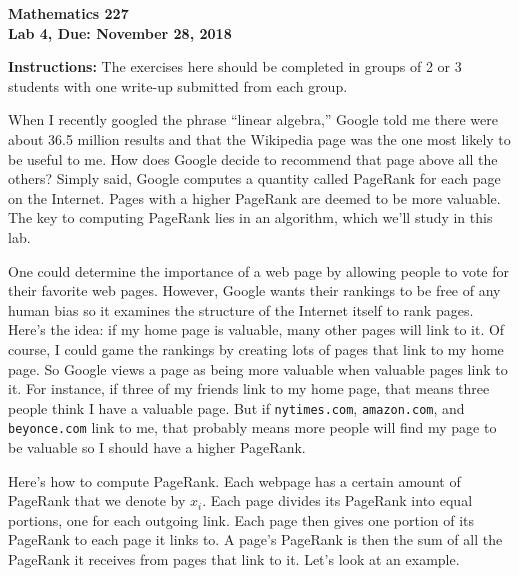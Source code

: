 \documentclass[12pt]{article}
\begin{document}
\noindent
{\bf Mathematics 227} \\ 
{\bf Lab 4, Due: November 28, 2018}

\bigskip
\noindent
{\bf Instructions:} The exercises here should be completed in groups
of 2 or 3 students with one write-up submitted from each group.

\medskip
When I recently googled the phrase ``linear algebra,'' Google told me
there were about 36.5 million results and that the Wikipedia page was
the one most likely to be useful to me.  How does Google decide to
recommend that page above all the others?  Simply said, Google
computes a quantity called PageRank for each page on the Internet.
Pages with a higher PageRank are deemed to be more valuable.  The key
to computing PageRank lies in an algorithm, which we'll study in this
lab.  

\medskip One could determine the importance of a web page by allowing
people to vote for their favorite web pages.  However, Google wants
their rankings to be free of any human bias so it examines the
structure of the Internet itself to rank pages.  Here's the idea:  if
my home page is valuable, many other pages will link to it.  Of course, I
could game the rankings by creating lots of pages that link to my home
page.  So Google views a page as being more valuable when valuable
pages link to it.  For instance, if three of my friends link to my
home page, that means three people think I have a valuable page.  But
if {\tt nytimes.com}, {\tt amazon.com}, and {\tt beyonce.com} link to
me, that probably means more people will find my page to be valuable
so I should have a higher PageRank.

\medskip
Here's how to compute PageRank.  Each webpage has a certain amount of
PageRank that we denote by $x_i$.  Each page divides its PageRank into
equal portions, one for each outgoing link.  Each page then gives one
portion of its PageRank to each page it links to.  A page's PageRank
is then the sum of all the PageRank it receives from pages that link
to it.  Let's look at an example.
\end{document}
